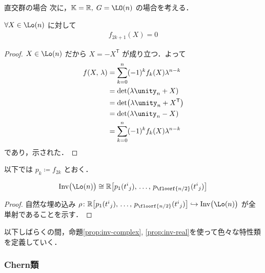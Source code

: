 \documentclass[TQFT_main]{subfiles}
\begin{document}
\begin{myexample}[label=case:orthogonal]{直交群の場合}
    次に，$\mathbb{K} = \mathbb{R},\; G = \LO(n)$ の場合を考える．
    
    \begin{mylem}[label=lem:odd-vanish]{}
        $\forall X \in \Lo(n)$ に対して
        \begin{align}
            f_{2k+1}(X) = 0
        \end{align}
    \end{mylem}
    
    \begin{proof}
        $X \in \Lo(n)$ だから $X = - X^{\mathsf{T}}$ が成り立つ．よって
        \begin{align}
            f(X,\, \lambda)
            &=  \sum_{k=0}^n (-1)^k f_k(X) \lambda^{n-k} \\
            &= \det(\lambda \unity_n + X) \\
            &= \det(\lambda \unity_n + X^{\mathsf{T}}) \\
            &= \det(\lambda \unity_n - X) \\
            &= \sum_{k=0}^n (-1)^k f_k(X) \lambda^{n-k}
        \end{align}
        であり，示された．
    \end{proof}
    
    以下では $p_k \coloneqq f_{2k}$ とおく．

    \begin{myprop}[label=prop:inv-ortho]{}
        \begin{align}
            \mathrm{Inv} \bigl( \Lo(n) \bigr) \cong \mathbb{R} \bigl[p_1(t^i{}_j),\, \dots,\, p_{\floorf{n/2}}(t^i{}_j)\bigr]
        \end{align}
    \end{myprop}
    
    \begin{proof}
        自然な埋め込み $\rho \colon \mathbb{R}\bigl[p_1(t^i{}_j),\, \dots,\, p_{\floorf{n/2}}(t^i{}_j)\bigr] \hookrightarrow \mathrm{Inv} \bigl( \Lo(n) \bigr)$ が全単射であることを示す．
        
    \end{proof}
    
\end{myexample}


以下しばらくの間，命題\ref{prop:inv-complex}, \ref{prop:inv-real}を使って色々な特性類を定義していく．

\subsubsection{Chern類}
\end{document}
